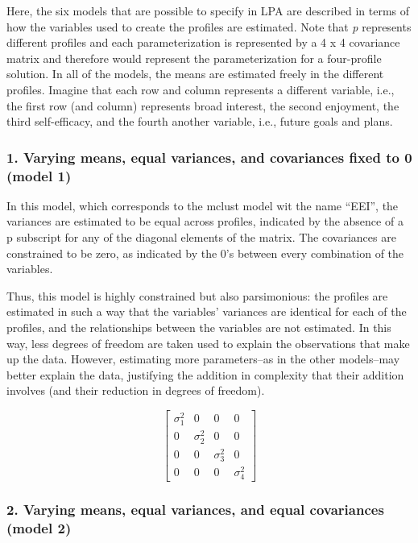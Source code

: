 \documentclass[]{book}
\theoremstyle{definition}
\theoremstyle{definition}
\theoremstyle{definition}
\theoremstyle{remark}
\begin{document}
Here, the six models that are possible to specify in LPA are described
in terms of how the variables used to create the profiles are estimated.
Note that \emph{p} represents different profiles and each
parameterization is represented by a 4 x 4 covariance matrix and
therefore would represent the parameterization for a four-profile
solution. In all of the models, the means are estimated freely in the
different profiles. Imagine that each row and column represents a
different variable, i.e., the first row (and column) represents broad
interest, the second enjoyment, the third self-efficacy, and the fourth
another variable, i.e., future goals and plans.

\subsubsection{1. Varying means, equal variances, and covariances fixed
to 0 (model
1)}\label{varying-means-equal-variances-and-covariances-fixed-to-0-model-1}

In this model, which corresponds to the mclust model wit the name
``EEI'', the variances are estimated to be equal across profiles,
indicated by the absence of a p subscript for any of the diagonal
elements of the matrix. The covariances are constrained to be zero, as
indicated by the 0's between every combination of the variables.

Thus, this model is highly constrained but also parsimonious: the
profiles are estimated in such a way that the variables' variances are
identical for each of the profiles, and the relationships between the
variables are not estimated. In this way, less degrees of freedom are
taken used to explain the observations that make up the data. However,
estimating more parameters--as in the other models--may better explain
the data, justifying the addition in complexity that their addition
involves (and their reduction in degrees of freedom).

\[
\left[ \begin{matrix} { \sigma  }_{ 1 }^{ 2 } & 0 & 0 & 0 \\ 0 & { \sigma  }_{ 2 }^{ 2 } & 0 & 0 \\ 0 & 0 & { \sigma  }_{ 3 }^{ 2 } & 0 \\ 0 & 0 & 0 & { \sigma  }_{ 4 }^{ 2 } \end{matrix} \right] 
\]

\subsubsection{2. Varying means, equal variances, and equal covariances
(model
2)}\label{varying-means-equal-variances-and-equal-covariances-model-2}
\end{document}
